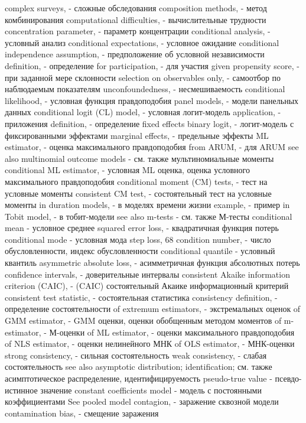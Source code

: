 complex surveys, - сложные обследования
composition methods, - метод комбинирования
computational difficulties, - вычислительные трудности
concentration parameter, - параметр концентрации
conditional analysis, - условный анализ
conditional expectations, - условное ожидание
conditional independence assumption, - предположение об условной независимости
definition, - определение
for participation, - для участия
given propensity score, - при заданной мере склонности
selection on observables only, - самоотбор по наблюдаемым показателям
unconfoundedness, - несмешиваемость
conditional likelihood, - условная функция правдоподобия
panel models, - модели панельных данных
conditional logit (CL) model, - условная логит-модель
application, - приложения
definition, - определение
fixed effects binary logit, - логит-модель с фиксированными эффектами
marginal effects, - предельные эффекты
ML estimator, - оценка максимального правдоподобия
from ARUM, - для ARUM
see also multinomial outcome models - см. также мультиномиальные моменты
conditional ML estimator, - условная ML оценка, оценка условного максимального правдоподобия
conditional moment (CM) tests, - тест на условные моменты
consistent CM test, - состоятельный тест на условные моменты
in duration models, - в моделях времени жизни
example, - пример
in Tobit model, - в тобит-модели
see also m-tests - см. также М-тесты
conditional mean - условное среднее
squared error loss, - квадратичная функция потерь
conditional mode - условная мода
step loss, 68
condition number, - число обусловленности, индекс обусловленности
conditional quantile - условный квантиль
asymmetric absolute loss, - асимметричная функция абсолютных потерь
confidence intervals, - доверительные интервалы
consistent Akaike information criterion (CAIC), - (CAIC) состоятельный Акаике информационный критерий
consistent test statistic, - состоятельная статистика
consistency definition, - определение состоятельности
of extremum estimators, - экстремальных оценок
of GMM estimator, - GMM оценки, оценки обобщенным методом моментов
of m-estimator, - М-оценки
of ML estimator, - оценки максимального правдоподобия
of NLS estimator, - оценки нелинейного МНК
of OLS estimator, - МНК-оценки
strong consistency, - сильная состоятельность
weak consistency, - слабая состоятельность
see also asymptotic distribution; identification; см. также асимптотическое распределение, идентифицируемость
pseudo-true value - псевдо-истинное значение
constant coefficients model - модель с постоянными коэффициентами
See pooled model contagion, - заражение сквозной модели
contamination bias, - смещение заражения
